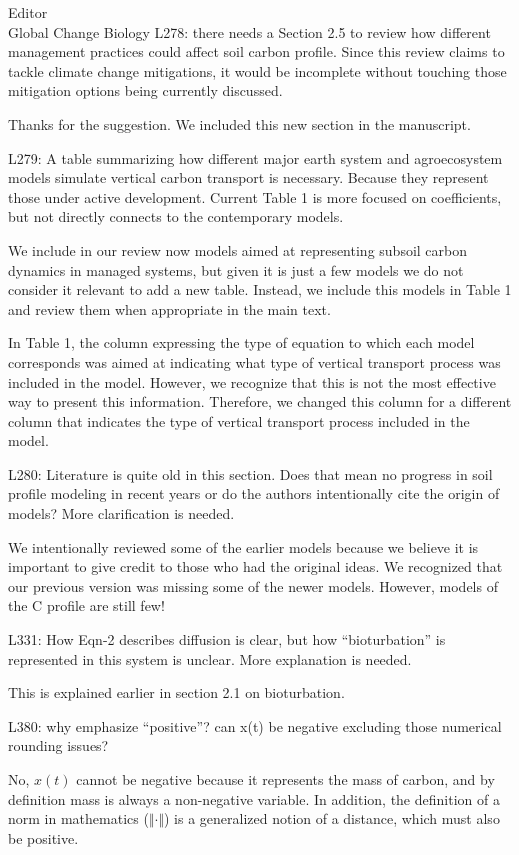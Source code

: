 \documentclass[11pt]{bgcletter}
\newcommand{\answer}[1] {
{\color{cyan} #1}
}
\begin{document}
\begin{letter}{Editor\\
   Global Change Biology
}
L278: there needs a Section 2.5 to review how different management practices could affect soil carbon profile. Since this review claims to tackle climate change mitigations, it would be incomplete without touching those mitigation options being currently discussed.

\answer{Thanks for the suggestion. We included this new section in the manuscript. }

L279: A table summarizing how different major earth system and agroecosystem models simulate vertical carbon transport is necessary. Because they represent those under active development. Current Table 1 is more focused on coefficients, but not directly connects to the contemporary models.

\answer{We include in our review now models aimed at representing subsoil carbon dynamics in managed systems, but given it is just a few models we do not consider it relevant to add a new table. Instead, we include this models in Table 1 and review them when appropriate in the main text.

In Table 1, the column expressing the type of equation to which each model corresponds was aimed at indicating what type of vertical transport process was included in the model. However, we recognize that this is not the most effective way to present this information. Therefore, we changed this column for a different column that indicates the type of vertical transport process included in the model.}

L280: Literature is quite old in this section. Does that mean no progress in soil profile modeling in recent years or do the authors intentionally cite the origin of models? More clarification is needed.

\answer{We intentionally reviewed some of the earlier models because we believe it is important to give credit to those who had the original ideas. We recognized that our previous version was missing some of the newer models. However, models of the C profile are still few!}

L331: How Eqn-2 describes diffusion is clear, but how ``bioturbation'' is represented in this system is unclear. More explanation is needed.

\answer{This is explained earlier in section 2.1 on bioturbation.}

L380: why emphasize ``positive''? can x(t) be negative excluding those numerical rounding issues? 

\answer{No, $x(t)$ cannot be negative because it represents the mass of carbon, and by definition mass is always a non-negative variable. In addition, the definition of a norm in mathematics ($\Vert \cdot \Vert$) is a generalized notion of a distance, which must also be positive. }


\end{letter}
\end{document}
